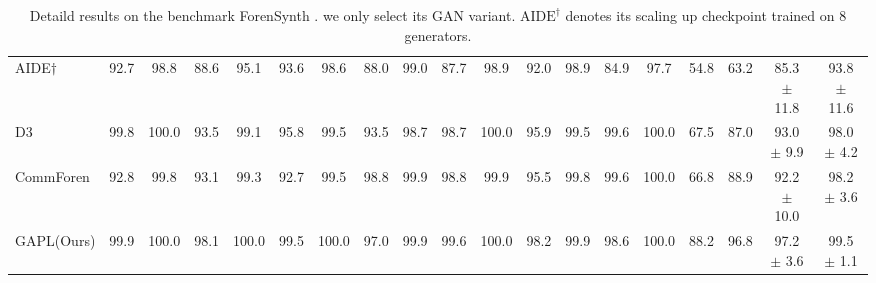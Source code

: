\begin{table}[t]
{\begin{tabular}{l cc cc cc cc cc cc cc cc cc}
AIDE$\dagger$ \cite{yan2024sanity} & 92.7 & 98.8 & 88.6 & 95.1 & 93.6 & 98.6 & 88.0 & 99.0 & 87.7 & 98.9 & 92.0 & 98.9 & 84.9 & 97.7 & 54.8 & 63.2 & 85.3 $\pm$  11.8 & 93.8 $\pm$ 11.6 \\
D3 \cite{yang2025d3} & 99.8 & 100.0 & 93.5 & 99.1 & 95.8 & 99.5 & 93.5 & 98.7 & 98.7 & 100.0 & 95.9 & 99.5 & 99.6 & 100.0 & 67.5 & 87.0 & 93.0 $\pm$ 9.9 & 98.0 $\pm$ 4.2 \\
CommForen \cite{park2025commfor} & 92.8 & 99.8 & 93.1 & 99.3 & 92.7 & 99.5 &  98.8 & 99.9 & 98.8 & 99.9 & 95.5 & 99.8 & 99.6 & 100.0 & 66.8 & 88.9 & 92.2 $\pm$ 10.0 & 98.2 $\pm$ 3.6 \\
\rowcolor{cvprblue!20} 
GAPL(Ours) & 99.9 & 100.0 & 98.1 & 100.0 & 99.5 & 100.0 & 97.0 & 99.9 & 99.6 & 100.0 & 98.2 & 99.9 & 98.6 & 100.0 & 88.2 & 96.8 & 97.2 $\pm$ 3.6 & 99.5 $\pm$ 1.1 \\
\bottomrule
\end{tabular}
}
\caption{Detaild results on the benchmark ForenSynth \cite{wang2020cnn}. we only select its GAN variant. $\text{AIDE}^{\dagger}$ denotes its scaling up checkpoint trained on 8 generators.}
\label{tab:Forensynths}
\end{table}


